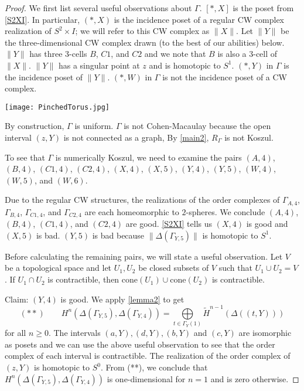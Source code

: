 \documentclass[11pt,righttag]{amsart}
\theoremstyle{definition}
\begin{document}
\begin{proof}

We first list several useful observations about $\Gamma$. $[*, X]$ is the poset from \ref{S2XI}. In particular, $(*, X)$ is the incidence poset of a regular CW complex realization of $S^2 \times I$; we will refer to this CW complex as $\| X \|$. Let $\| Y \|$ be the three-dimensional CW complex drawn (to the best of our abilities) below. $\| Y \|$ has three $3$-cells $B$, $C1$, and $C2$ and we note that $B$ is also a $3$-cell of $\| X \|$. $\| Y \|$ has a singular point at $z$ and is homotopic to $S^1$. $(*, Y)$ in $\Gamma$ is the incidence poset of $\| Y \|$. $(*, W)$ in $\Gamma$ is not the incidence poset of a CW complex. 

\begin{center}
\texttt{[image: PinchedTorus.jpg]}
\end{center}

By construction, $\Gamma$ is uniform. $\Gamma$ is not Cohen-Macaulay because the open interval $(z, Y)$ is not connected as a graph, By \ref{main2}, $R_\Gamma$ is not Koszul.

To see that $\Gamma$ is numerically Koszul, we need to examine the pairs $(A,4)$, $(B,4)$, $(C1,4)$, $(C2, 4)$, $(X,4)$, $(X,5)$, $(Y,4)$, $(Y, 5)$, $(W, 4)$, $(W, 5)$, and $(W, 6)$. 

Due to the regular CW structures, the realizations of the order complexes of $\Gamma_{A, 4}$, $\Gamma_{B, 4}$, $\Gamma_{C1, 4}$, and $\Gamma_{C2, 4}$ are each homeomorphic to $2$-spheres. We conclude $(A,4)$, $(B,4)$, $(C1,4)$, and $(C2, 4)$ are good. \ref{S2XI} tells us $(X, 4)$ is good and $(X, 5)$ is bad. $(Y, 5)$ is bad because $\| \Delta(\Gamma_{Y,5})\|$ is homotopic to $S^1$. 

Before calculating the remaining pairs, we will state a useful observation. Let $V$ be a topological space and let $U_1, U_2$ be closed subsets of $V$ such that $U_1 \cup U_2 = V$. If $U_1 \cap U_2$ is contractible, then $\text{cone}(U_1) \cup \text{cone}(U_2)$ is contractible. 

Claim: $(Y, 4)$ is good. We apply \ref{lemma2} to get 
$$(**)  \qquad H^n(\Delta(\Gamma_{Y,5}), \Delta(\Gamma_{Y, 4}))= \bigoplus\limits_{t\in \Gamma_Y(1)} \tilde H^{n-1}(\Delta((t,Y)))$$
for all $n \geq 0$. The intervals $(a, Y), (d, Y), (b, Y)$ and $(c, Y)$ are isomorphic as posets and we can use the above useful observation to see that the order complex of each interval is contractible. 
The realization of the order complex of $(z, Y)$ is homotopic to $S^0$. From (**), we conclude that $H^n(\Delta(\Gamma_{Y, 5}), \Delta(\Gamma_{Y, 4}))$ is one-dimensional for $n = 1$ and is zero otherwise. 


\end{proof}
\end{document}
